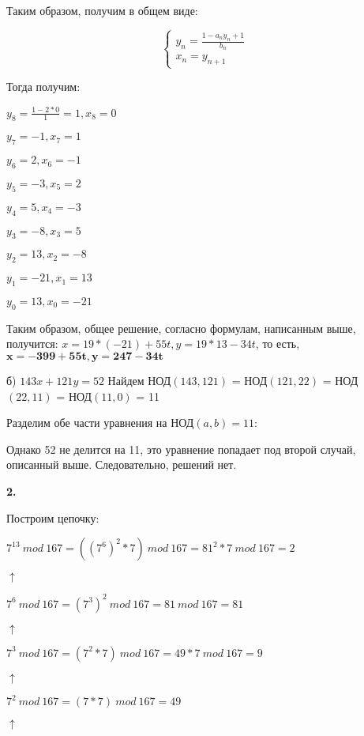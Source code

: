\documentclass[12pt]{extreport}
\begin{document}
Таким образом, получим в общем виде:

\begin{equation*}
\begin{cases}
y_n = \frac{1-a_n y_n+1}{b_n} \\
x_n = y_{n+1}

\end{cases}
\end{equation*}

Тогда получим: 

$y_8 = \frac{1-2*0}{1}=1, x_8 = 0$

$y_7 = -1, x_7 = 1$

$y_6 = 2, x_6 = -1$

$y_5 = -3, x_5 = 2$

$y_4 = 5, x_4 = -3$

$y_3 = -8, x_3 = 5$

$y_2 = 13, x_2 = -8$

$y_1 = -21, x_1 = 13$

$y_0= 13, x_0 = -21$

Таким образом, общее решение, согласно формулам, написанным выше, получится: $x = 19*(-21) +55t, y = 19*13-34t$, то есть, $ \mathbf{x = -399 +55t, y=247-34t}$

\bigskip
б) $143x + 121y = 52$
Найдем НОД$(143, 121)$ = НОД$(121, 22)$ = НОД$(22, 11)$ = НОД$(11, 0)$ = 11

Разделим обе части уравнения на НОД$(a,b) =11$:

Однако 52 не делится на 11, это уравнение попадает под второй случай, описанный выше. Следовательно, решений нет. 


\bigskip
{\bf 2.}  

Построим цепочку: 

$7^{13} \:mod \:167 = ((7^6)^2*7) \:mod\: 167 = 81^2*7 \:mod \:167 = 2$

\hspace{16 mm} $\uparrow$

$7^6\: mod\: 167 = (7^3)^2\: mod \:167 = 81 \:mod \:167 = 81$

\hspace{16 mm} $\uparrow$


$7^3 \:mod \:167 = (7^2*7) \:mod \:167 = 49*7\: mod\: 167 = 9$

\hspace{16 mm} $\uparrow$


$7^2 \:mod\: 167 = (7*7)\: mod \:167 = 49$ 

\hspace{16 mm} $\uparrow$
\end{document}
